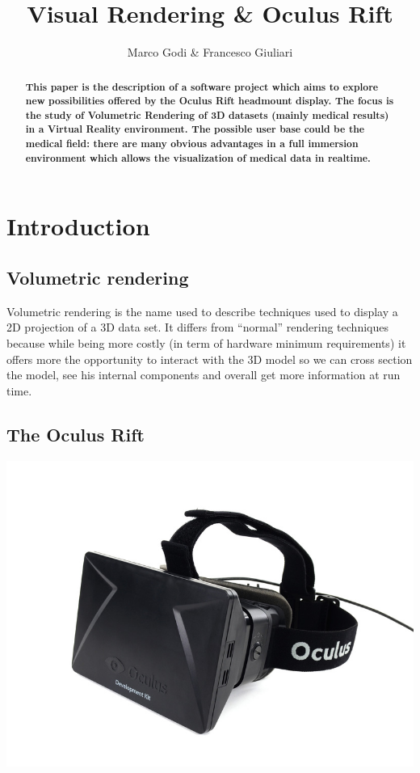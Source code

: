 \documentclass[11pt]{article} %
\title{Visual Rendering \& Oculus Rift}
\author{Marco Godi \& Francesco Giuliari}
\affil{Università degli Studi di Verona}
\begin{document}
\maketitle



\tableofcontents





\newpage
\begin{abstract}
\textbf{ This paper is the description of a software project which aims to explore new possibilities offered by the Oculus Rift headmount display. The focus is the study of Volumetric Rendering of 3D datasets (mainly medical results) in a Virtual Reality environment. The possible user base could be the medical field: there are many obvious advantages in a full immersion environment which allows the visualization of medical data in realtime. }
\end{abstract}
\section {Introduction}


\subsection{Volumetric rendering}
Volumetric rendering is the name used to describe techniques used to display a 2D projection of a 3D data set. It differs from ``normal'' rendering techniques because while being more costly (in term of hardware minimum requirements) it offers more the opportunity to interact with the 3D model so we can cross section the model, see his internal components and overall get more information at run time.  

\subsection{The Oculus Rift}

\includegraphics[width=0.6\linewidth]{oculus.jpg}
\end{document}
